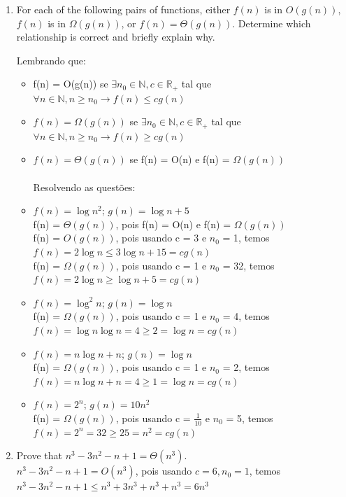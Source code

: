 \documentclass{article}
\begin{document}
	\begin{enumerate}[label=\Alph*]
		\item For each of the following pairs of functions, either $f(n)$ is in $O(g(n))$, $f(n)$ is in $\Omega(g(n))$, or $f(n) = \Theta(g(n))$. Determine which relationship is correct and briefly explain why.
		
		Lembrando que: 
		\begin{itemize}
			\item f(n) = O(g(n)) se $\exists n_{0}\in \mathbb{N}, c \in \mathbb{R}_+$ tal que $\forall n \in \mathbb{N}, n\geq n_{0} \to f(n) \leq cg(n)$
			\item $f(n) = \Omega(g(n))$ se $\exists n_{0}\in \mathbb{N}, c \in \mathbb{R}_+ $ tal que $\forall n \in \mathbb{N}, n\geq n_{0} \to f(n) \geq cg(n)$
			\item $f(n) = \Theta(g(n))$ se f(n) = O(n) e f(n) = $\Omega(g(n))$
			\\ \\
			Resolvendo as questões:
		\end{itemize}
		\begin{itemize}
			\item $f(n) = \log n^2$; $g(n) = \log n + 5$ \\
			f(n) = $\Theta (g(n))$, pois f(n) = O(n) e f(n) = $\Omega(g(n))$ \\
			f(n) = $O(g(n))$, pois usando c = 3 e $n_0$ = 1, temos $f(n) = 2\log n \leq 3\log n  + 15 = cg(n)$\\
			f(n) = $\Omega(g(n))$, pois usando c = 1 e $n_0$ = 32, temos $f(n) = 2\log n \geq \log n  + 5 = cg(n)$
			
			\item $f(n) = \log^2 n$; $g(n) = \log n$ \\
			f(n) = $\Omega(g(n))$, pois usando c = 1 e $n_0$ = 4, temos $f(n) = \log n\log n = 4 \geq 2 = \log n = cg(n)$
			
			\item $f(n) = n\log n + n$; $g(n) = \log n$ \\
			f(n) = $\Omega(g(n))$, pois usando c = 1 e $n_0$ = 2, temos $f(n) = n\log n + n = 4 \geq 1 = \log n = cg(n)$
			
			\item $f(n) = 2^n$; $g(n) = 10n^2$ \\
			f(n) = $\Omega (g(n))$, pois usando c = $\frac{1}{10}$ e $n_0$ = 5, temos $f(n) = 2^n = 32 \geq 25 = n^2 = cg(n)$
		\end{itemize}
		
		\item Prove that $n^3 -3n^2 -n+1 = \Theta(n^3)$. \\
		$n^3 -3n^2 -n+1 = O(n^3)$, pois usando $c = 6, n_0 = 1$, temos $ n^3 -3n^2 -n+1 \leq n^3 +3n^3 +n^3+n^3  = 6n^3 $
		

\end{enumerate}
\end{document}
